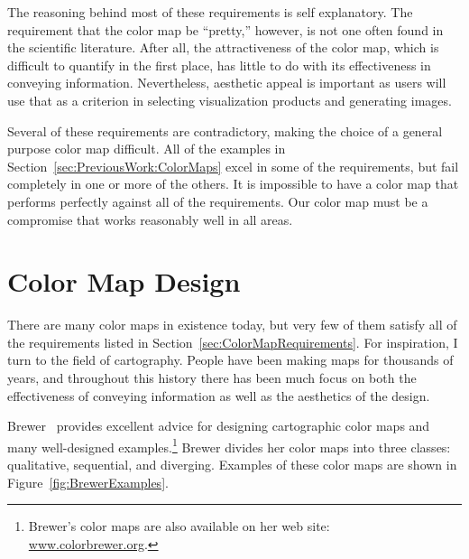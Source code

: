 \documentclass[review,journal]{vgtc}         %
\newcommand{\scite}[1]{~\cite{#1}}
\begin{document}
The reasoning behind most of these requirements is self explanatory.  The
requirement that the color map be ``pretty,'' however, is not one often
found in the scientific literature.  After all, the attractiveness of the
color map, which is difficult to quantify in the first place, has little to
do with its effectiveness in conveying information.  Nevertheless, aesthetic
appeal is important as users will use that as a criterion in selecting
visualization products and generating images.


Several of these requirements are contradictory, making the choice of a
general purpose color map difficult.  All of the examples in
Section~\ref{sec:PreviousWork:ColorMaps} excel in some of the requirements,
but fail completely in one or more of the others.  It is impossible to have
a color map that performs perfectly against all of the requirements.  Our color
map must be a compromise that works reasonably well in all areas.


\section{Color Map Design}
\label{sec:ColorMapDesign}

There are many color maps in existence today, but very few of them satisfy
all of the requirements listed in Section~\ref{sec:ColorMapRequirements}.
For inspiration, I turn to the field of cartography.  People
have been making maps for thousands of years, and throughout this history
there has been much focus on both the effectiveness of
conveying information as well as the aesthetics of the design.

Brewer\scite{Brewer05} provides excellent advice for designing cartographic
color maps and many well-designed examples.\footnote{Brewer's color maps
are also available on her web site:
\href{http://www.colorbrewer.org}{www.colorbrewer.org}.} Brewer divides her
color maps into three classes: qualitative, sequential, and diverging.
Examples of these color maps are shown in Figure~\ref{fig:BrewerExamples}.
\end{document}
